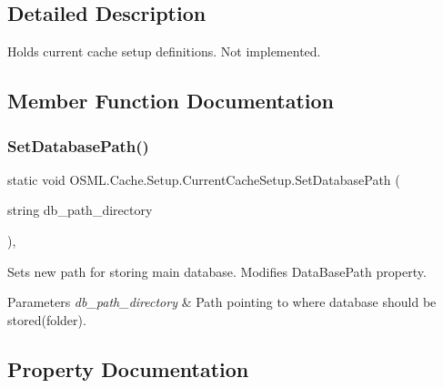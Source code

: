 \subsection{Detailed Description}
Holds current cache setup definitions. Not implemented. 



\subsection{Member Function Documentation}
\mbox{\label{classOSML_1_1Cache_1_1Setup_1_1CurrentCacheSetup_a83ae9cf7c7e5c3edfa4375bc8c3f4f76}} 
\subsubsection{\texorpdfstring{SetDatabasePath()}{SetDatabasePath()}}
{\footnotesize\ttfamily static void O\+S\+M\+L.\+Cache.\+Setup.\+Current\+Cache\+Setup.\+Set\+Database\+Path (\begin{DoxyParamCaption}\item[{string}]{db\+\_\+path\+\_\+directory }\end{DoxyParamCaption})\hspace{0.3cm}{\ttfamily [inline]}, {\ttfamily [static]}}



Sets new path for storing main database. Modifies Data\+Base\+Path property. 


\begin{DoxyParams}{Parameters}
{\em db\+\_\+path\+\_\+directory} & Path pointing to where database should be stored(folder).\\
\hline
\end{DoxyParams}


\subsection{Property Documentation}
\mbox{\label{classOSML_1_1Cache_1_1Setup_1_1CurrentCacheSetup_a3e5c536b009ba38125bb2605ef2071d3}} 
